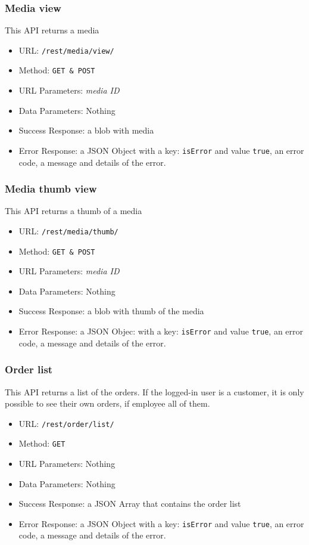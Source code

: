 \subsubsection*{Media view}

This API returns a media

\begin{itemize}
    \item URL: \texttt{/rest/media/view/}
    \item Method: \texttt{GET \& POST}
    \item URL Parameters: \textit{media ID}
    \item Data Parameters: Nothing
    \item Success Response: a blob with media
    \item Error Response: a JSON Object with a key: \texttt{isError}  and value \texttt{true}, an error code, a message and details of the error.
\end{itemize}

\subsubsection*{Media thumb view}

This API returns a thumb of a media

\begin{itemize}
    \item URL: \texttt{/rest/media/thumb/}
    \item Method: \texttt{GET \& POST}
    \item URL Parameters: \textit{media ID}
    \item Data Parameters: Nothing
    \item Success Response: a blob with thumb of the media
    \item Error Response: a JSON Objec: with a key: \texttt{isError}  and value \texttt{true}, an error code, a message and details of the error.
\end{itemize}


\subsubsection*{Order list}

This API returns a list of the orders.
If the logged-in user is a customer, it is only possible to see their own orders, if employee all of them.

\begin{itemize}
    \item URL: \texttt{/rest/order/list/}
    \item Method: \texttt{GET}
    \item URL Parameters: Nothing
    \item Data Parameters: Nothing
    \item Success Response: a JSON Array that contains the order list
    \item Error Response: a JSON Object with a key: \texttt{isError}  and value \texttt{true}, an error code, a message and details of the error.
\end{itemize}


